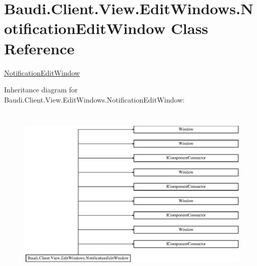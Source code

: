 \hypertarget{class_baudi_1_1_client_1_1_view_1_1_edit_windows_1_1_notification_edit_window}{}\section{Baudi.\+Client.\+View.\+Edit\+Windows.\+Notification\+Edit\+Window Class Reference}
\label{class_baudi_1_1_client_1_1_view_1_1_edit_windows_1_1_notification_edit_window}


\hyperlink{class_baudi_1_1_client_1_1_view_1_1_edit_windows_1_1_notification_edit_window}{Notification\+Edit\+Window}  


Inheritance diagram for Baudi.\+Client.\+View.\+Edit\+Windows.\+Notification\+Edit\+Window\+:\begin{figure}[H]
\begin{center}
\leavevmode
\includegraphics[height=8.562691cm]{class_baudi_1_1_client_1_1_view_1_1_edit_windows_1_1_notification_edit_window}
\end{center}
\end{figure}
